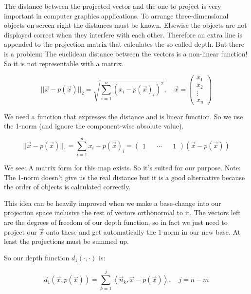 \documentclass{article}
\newcommand{\lrangle}[1]{\left\langle #1 \right\rangle}
\begin{document}
The distance between the projected vector and the one to project is very important in computer
graphics applications. To arrange three-dimensional objects on screen right the distances must be
known. Elsewise the objects are not displayed correct when they interfere with each other.
Therefore an extra line is appended to the projection matrix that calculates the so-called depth.
But there is a problem: The euclidean distance between the vectors is a non-linear function! So it
is not representable with a matrix.

	\begin{equation}
		||\vec{x} - p(\vec{x})||_2 = \sqrt{\sum_{i=1}^{n}{(x_i - p(\vec{x})_i)^2}}, \quad \vec{x} =
		\begin{pmatrix}
			x_1 \\
			x_2 \\
			\vdots \\
			x_n
		\end{pmatrix}
	\end{equation}

We need a function that expresses the distance and is linear function. So we use the 1-norm (and
ignore the component-wise absolute value).

	\begin{equation}
		||\vec{x} - p(\vec{x})||_1 = \sum_{i=1}^{n}{x_i - p(\vec{x})_i} = \begin{pmatrix} 1 && \cdots && 1 \end{pmatrix} (\vec{x} - p(\vec{x}))
	\end{equation}

We see: A matrix form for this map exists. So it's suited for our purpose. 
Note: The 1-norm doesn't give us the real distance but it is a good alternative because the order
of objects is calculated correctly.

This idea can be heavily improved when we make a base-change into our projection space inclusive
the rest of vectors orthonormal to it. The vectors left are the degrees of freedom of our depth
function, so in fact we just need to project our \(\vec{x}\) onto these and get automatically the
1-norm in our new base. At least the projections must be summed up.

So our depth function \(d_1(\cdot,\cdot)\) is:

	\begin{equation}
		d_1(\vec{x}, p(\vec{x})) = \sum_{k=1}^{j}{\lrangle{ \vec{n}_k, \vec{x} - p(\vec{x}) }},
		\quad j = n -m
	\end{equation}
\end{document}
